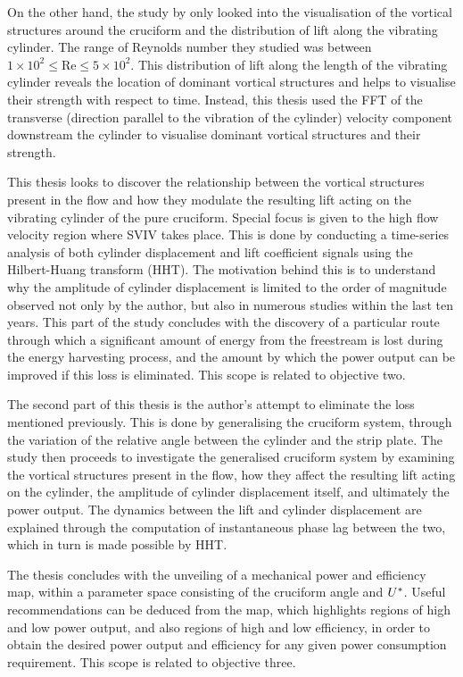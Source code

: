 \documentclass[oneside]{utmthesis}
\begin{document}
On the other hand, the study by \citet{Zhao2018a} only looked into the visualisation of the vortical structures around the cruciform and the distribution of lift along the vibrating cylinder. The range of Reynolds number they studied was between $1 \times 10^{2} \leq \text{Re} \leq 5 \times 10^{2}$. This distribution of lift along the length of the vibrating cylinder reveals the location of dominant vortical structures and helps to visualise their strength with respect to time. Instead, this thesis used the FFT of the transverse (direction parallel to the vibration of the cylinder) velocity component downstream the cylinder to visualise dominant vortical structures and their strength.

This thesis looks to discover the relationship between the vortical structures present in the flow and how they modulate the resulting lift acting on the vibrating cylinder of the pure cruciform. Special focus is given to the high flow velocity region where SVIV takes place. This is done by conducting a time-series analysis of both cylinder displacement and lift coefficient signals using the Hilbert-Huang transform (HHT). The motivation behind this is to understand why the amplitude of cylinder displacement is limited to the order of magnitude observed not only by the author, but also in numerous studies within the last ten years. This part of the study concludes with the discovery of a particular route through which a significant amount of energy from the freestream is lost during the energy harvesting process, and the amount by which the power output can be improved if this loss is eliminated. This scope is related to objective two.

The second part of this thesis is the author's attempt to eliminate the loss mentioned previously. This is done by generalising the cruciform system, through the variation of the relative angle between the cylinder and the strip plate. The study then proceeds to investigate the generalised cruciform system by examining the vortical structures present in the flow, how they affect the resulting lift acting on the cylinder, the amplitude of cylinder displacement itself, and ultimately the power output. The dynamics between the lift and cylinder displacement are explained through the computation of instantaneous phase lag between the two, which in turn is made possible by HHT.

The thesis concludes with the unveiling of a mechanical power and efficiency map, within a parameter space consisting of the cruciform angle and $U^{*}$. Useful recommendations can be deduced from the map, which highlights regions of high and low power output, and also regions of high and low efficiency, in order to obtain the desired power output and efficiency for any given power consumption requirement. This scope is related to objective three.
\end{document}
